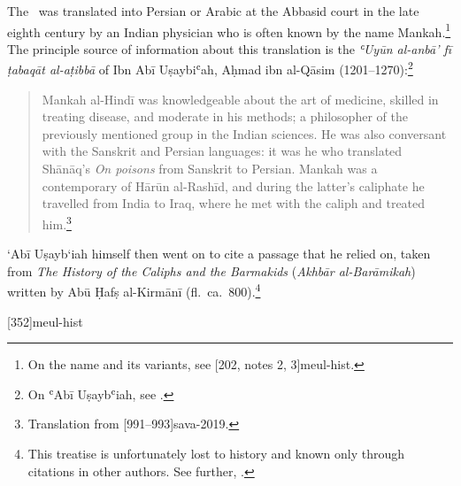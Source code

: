 The \SS\ was translated into Persian or Arabic at the Abbasid court in
the late eighth century by an Indian physician who is often known by
the name Mankah.\footnote{On the name and its variants, see
    [202, notes 2, 3]{meul-hist}.}  The principle source of
    information about this translation is the 
    \emph{ʿUyūn al-anbā' fī ṭabaqāt al-aṭibbā} of Ibn Abī Uṣaybiʿah, Aḥmad ibn 
    al-Qāsim
    (1201--1270):\footnote{On ʿAbī Uṣaybʿiah, see \cite{hill-2019}.}
\begin{quote}
    Mankah al-Hindī  was knowledgeable about the art of medicine,
skilled in treating disease, and moderate in his methods; a
philosopher of the previously mentioned group in the Indian
sciences. He was also conversant with the Sanskrit and Persian
languages: it was he who translated Shānāq’s \emph{On poisons}
from Sanskrit to Persian. Mankah was a contemporary of Hārūn
al-Rashīd, and during the latter’s caliphate he travelled from
India to Iraq, where he met with the caliph and treated 
him.\footnote{Translation from [991--993]{sava-2019}.}
\end{quote}
`Abī Uṣayb`iah himself then went on to cite a passage that he relied on, taken 
from  
\emph{The History of the Caliphs and the Barmakids}  (\emph{Akhbār 
al-Barāmikah}) written by  Abū Ḥafṣ 
al-Kirmānī (fl.\ ca.\ 800).\footnote{This treatise is unfortunately lost to history and 
known only 
through citations in other authors.   See further, \cite{bosw-1994,blad-2011}.}


[352]{meul-hist}
\cite{lang-2018}

